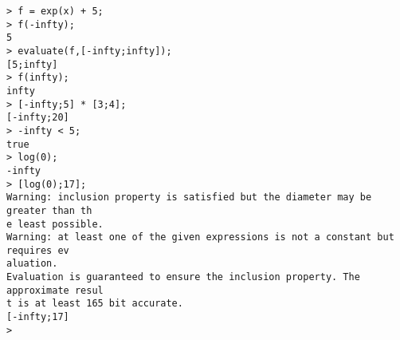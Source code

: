 \begin{center}\begin{minipage}{15cm}\begin{Verbatim}[frame=single]
> f = exp(x) + 5;
> f(-infty);
5
> evaluate(f,[-infty;infty]);
[5;infty]
> f(infty);
infty
> [-infty;5] * [3;4];
[-infty;20]
> -infty < 5;
true
> log(0);
-infty
> [log(0);17];
Warning: inclusion property is satisfied but the diameter may be greater than th
e least possible.
Warning: at least one of the given expressions is not a constant but requires ev
aluation.
Evaluation is guaranteed to ensure the inclusion property. The approximate resul
t is at least 165 bit accurate.
[-infty;17]
> 
\end{Verbatim}
\end{minipage}\end{center}
